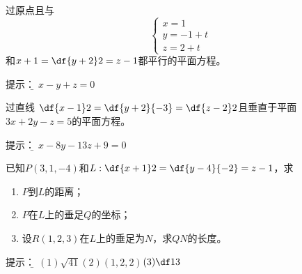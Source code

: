\begin{frame}
	\linespread{1.2}
	过原点且与
	$$\left\{\begin{array}{l}
	x=1\\ y=-1+t\\ z=2+t
	\end{array}\right.$$
	和$x+1=\df{y+2}2=z-1$都平行的平面方程。
	
	\pause\alert{提示：}{\it\b  
	$x-y+z=0$}
	\bigskip

	\pause
	过直线
	$\df{x-1}2=\df{y+2}{-3}=\df{z-2}2$且垂直于平面
	$3x+2y-z=5$的平面方程。
	
	\pause\alert{提示：}\it\b  
	$x-8y-13z+9=0$
\end{frame}

% 	

\begin{frame}
	\linespread{1.2}
	已知$P(3,1,-4)$和$L:\df{x+1}2=\df{y-4}{-2}=z-1$，求
	\begin{enumerate}
	  \item $P$到$L$的距离；
	  \item $P$在$L$上的垂足$Q$的坐标；
	  \item 设$R(1,2,3)$在$L$上的垂足为$N$，求$QN$的长度。
	\end{enumerate}
	
	\pause\alert{提示：}\it\b
	$(1)\sqrt{41}$\quad$(2)(1,2,2)$\quad$(3)\df13$  
\end{frame}


